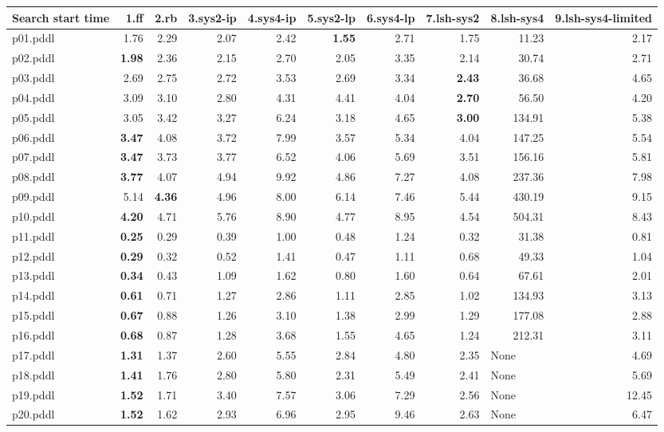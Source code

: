 \documentclass{article}
\begin{document}
\begin{tabular}{@{}lrrrrrrrrr@{}}
Search start time & 1.ff & 2.rb & 3.sys2-ip & 4.sys4-ip & 5.sys2-lp & 6.sys4-lp & 7.lsh-sys2 & 8.lsh-sys4 & 9.lsh-sys4-limited \\
\midrule
p01.pddl & 1.76 & 2.29 & 2.07 & 2.42 & \textbf{1.55} & 2.71 & 1.75 & 11.23 & 2.17 \\
p02.pddl & \textbf{1.98} & 2.36 & 2.15 & 2.70 & 2.05 & 3.35 & 2.14 & 30.74 & 2.71 \\
p03.pddl & 2.69 & 2.75 & 2.72 & 3.53 & 2.69 & 3.34 & \textbf{2.43} & 36.68 & 4.65 \\
p04.pddl & 3.09 & 3.10 & 2.80 & 4.31 & 4.41 & 4.04 & \textbf{2.70} & 56.50 & 4.20 \\
p05.pddl & 3.05 & 3.42 & 3.27 & 6.24 & 3.18 & 4.65 & \textbf{3.00} & 134.91 & 5.38 \\
p06.pddl & \textbf{3.47} & 4.08 & 3.72 & 7.99 & 3.57 & 5.34 & 4.04 & 147.25 & 5.54 \\
p07.pddl & \textbf{3.47} & 3.73 & 3.77 & 6.52 & 4.06 & 5.69 & 3.51 & 156.16 & 5.81 \\
p08.pddl & \textbf{3.77} & 4.07 & 4.94 & 9.92 & 4.86 & 7.27 & 4.08 & 237.36 & 7.98 \\
p09.pddl & 5.14 & \textbf{4.36} & 4.96 & 8.00 & 6.14 & 7.46 & 5.44 & 430.19 & 9.15 \\
p10.pddl & \textbf{4.20} & 4.71 & 5.76 & 8.90 & 4.77 & 8.95 & 4.54 & 504.31 & 8.43 \\
p11.pddl & \textbf{0.25} & 0.29 & 0.39 & 1.00 & 0.48 & 1.24 & 0.32 & 31.38 & 0.81 \\
p12.pddl & \textbf{0.29} & 0.32 & 0.52 & 1.41 & 0.47 & 1.11 & 0.68 & 49.33 & 1.04 \\
p13.pddl & \textbf{0.34} & 0.43 & 1.09 & 1.62 & 0.80 & 1.60 & 0.64 & 67.61 & 2.01 \\
p14.pddl & \textbf{0.61} & 0.71 & 1.27 & 2.86 & 1.11 & 2.85 & 1.02 & 134.93 & 3.13 \\
p15.pddl & \textbf{0.67} & 0.88 & 1.26 & 3.10 & 1.38 & 2.99 & 1.29 & 177.08 & 2.88 \\
p16.pddl & \textbf{0.68} & 0.87 & 1.28 & 3.68 & 1.55 & 4.65 & 1.24 & 212.31 & 3.11 \\
p17.pddl & \textbf{1.31} & 1.37 & 2.60 & 5.55 & 2.84 & 4.80 & 2.35 & \multicolumn{1}{|l|}{None} & 4.69 \\
p18.pddl & \textbf{1.41} & 1.76 & 2.80 & 5.80 & 2.31 & 5.49 & 2.41 & \multicolumn{1}{|l|}{None} & 5.69 \\
p19.pddl & \textbf{1.52} & 1.71 & 3.40 & 7.57 & 3.06 & 7.29 & 2.56 & \multicolumn{1}{|l|}{None} & 12.45 \\
p20.pddl & \textbf{1.52} & 1.62 & 2.93 & 6.96 & 2.95 & 9.46 & 2.63 & \multicolumn{1}{|l|}{None} & 6.47 \\
\end{tabular}
\end{document}
